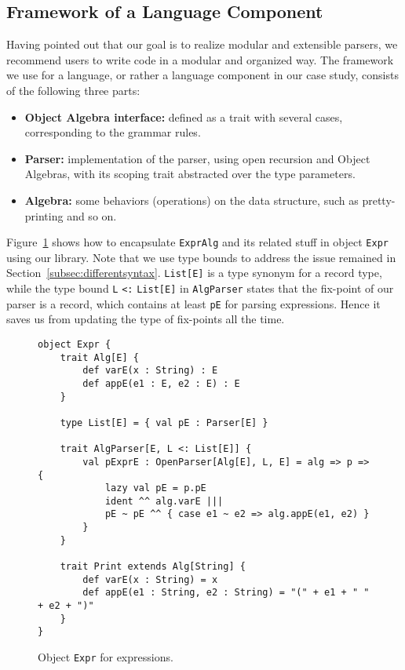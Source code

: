 \subsection{Framework of a Language Component}\label{subsec:framework}

Having pointed out that our goal is to realize modular and extensible parsers, we recommend users to write code in a modular and
organized way. The framework we use for a language, or rather a language component in our case study, consists of the following three
parts:
\begin{itemize}
\item \textbf{Object Algebra interface:} defined as a trait with several cases, corresponding to the grammar rules.
\item \textbf{Parser:} implementation of the parser, using open recursion and Object Algebras, with its scoping trait abstracted over the type parameters.
\item \textbf{Algebra:} some behaviors (operations) on the data structure, such as pretty-printing and so on.
\end{itemize}

Figure~\ref{fig:objectexpr} shows how to encapsulate \lstinline{ExprAlg} and its related stuff in object \lstinline{Expr} using our library. Note that we use type bounds to address the issue remained in Section~\ref{subsec:differentsyntax}. \lstinline{List[E]} is a type synonym for a record type, while the type bound \lstinline{L} \lstinline{<:} \lstinline{List[E]} in \lstinline{AlgParser} states that the fix-point of our parser is a record, which contains at least \lstinline{pE} for parsing expressions. Hence it saves us from updating the type of fix-points all the time.

\begin{figure}[htbp]
\centering
\begin{lstlisting}
object Expr {
    trait Alg[E] {
        def varE(x : String) : E
        def appE(e1 : E, e2 : E) : E
    }

    type List[E] = { val pE : Parser[E] }

    trait AlgParser[E, L <: List[E]] {
        val pExprE : OpenParser[Alg[E], L, E] = alg => p => {
            lazy val pE = p.pE
            ident ^^ alg.varE |||
            pE ~ pE ^^ { case e1 ~ e2 => alg.appE(e1, e2) }
        }
    }

    trait Print extends Alg[String] {
        def varE(x : String) = x
        def appE(e1 : String, e2 : String) = "(" + e1 + " " + e2 + ")"
    }
}
\end{lstlisting}
\caption{Object \lstinline{Expr} for expressions.}\label{fig:objectexpr}
\end{figure}

